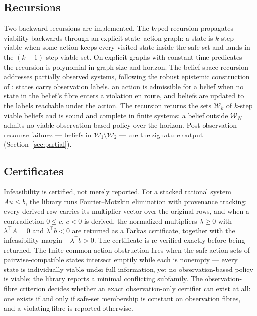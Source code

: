 \documentclass[3p,11pt]{elsarticle}
\begin{document}
\subsection{Recursions}\label{sec:recursions}

Two backward recursions are implemented. The typed recursion propagates
viability backwards through an explicit state--action graph: a state is
$k$-step viable when some action keeps every visited state inside the safe
set and lands in the $(k-1)$-step viable set. On explicit graphs with
constant-time predicates the recursion is polynomial in graph size and
horizon. The belief-space recursion addresses partially observed systems,
following the robust epistemic construction of \citet{Abaee2026b}: states carry
observation labels, an action is admissible for a belief when no state in
the belief's fibre enters a violation en route, and beliefs are updated to
the labels reachable under the action. The recursion returns the sets
$\mathcal{W}_k$ of $k$-step viable beliefs and is sound and complete in
finite systems: a belief outside $\mathcal{W}_N$ admits no viable
observation-based policy over the horizon. Post-observation recourse
failures --- beliefs in $\mathcal{W}_1 \setminus \mathcal{W}_2$ --- are the
signature output (Section~\ref{sec:partial}).

\subsection{Certificates}\label{sec:certificates}

Infeasibility is certified, not merely reported. For a stacked rational
system $A u \leq b$, the library runs Fourier--Motzkin elimination with
provenance tracking: every derived row carries its multiplier vector over
the original rows, and when a contradiction $0 \leq c$, $c < 0$ is derived,
the normalized multipliers $\lambda \geq 0$ with $\lambda^{\top} A = 0$ and
$\lambda^{\top} b < 0$ are returned as a Farkas certificate, together with
the infeasibility margin $-\lambda^{\top} b > 0$. The certificate is
re-verified exactly before being returned. The finite common-action
obstruction fires when the safe-action sets of pairwise-compatible states
intersect emptily while each is nonempty --- every state is individually
viable under full information, yet no observation-based policy is viable;
the library reports a minimal conflicting subfamily. The observation-fibre
criterion decides whether an exact observation-only certifier can exist at
all: one exists if and only if safe-set membership is constant on
observation fibres, and a violating fibre is reported otherwise.
\end{document}
